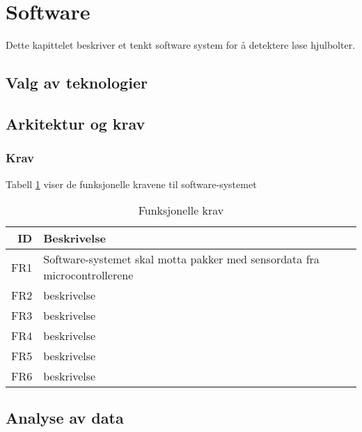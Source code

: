 \section{Software}
Dette kapittelet beskriver et tenkt software system for å detektere løse hjulbolter.

\subsection{Valg av teknologier}

\subsection{Arkitektur og krav}
\subsubsection{Krav}
Tabell \ref{tab:frequirements} viser de funksjonelle kravene til software-systemet
\begin{table}
\caption{Funksjonelle krav}
\label{tab:frequirements}
\begin{tabular}{r | l}
ID & Beskrivelse \\ 
\hline
FR1 & Software-systemet skal motta pakker med sensordata fra microcontrollerene \\
FR2 & beskrivelse \\
FR3 & beskrivelse \\
FR4 & beskrivelse \\
FR5 & beskrivelse \\
FR6 & beskrivelse \\
\hline
\end{tabular}
\end{table}

\subsection{Analyse av data}




